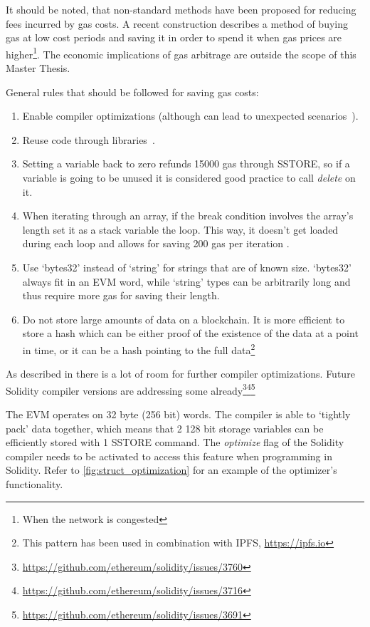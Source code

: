 It should be noted, that non-standard methods have been proposed for reducing fees incurred by gas costs. A recent construction \cite{gastoken} describes a method of buying gas at low cost periods and saving it in order to spend it when gas prices are higher\footnote{When the network is congested}. The economic implications of gas arbitrage are outside the scope of this Master Thesis. 

General rules that should be followed for saving gas costs:
\begin{enumerate}
    \item Enable compiler optimizations (although can lead to unexpected scenarios~\cite{compiler}).
    \item Reuse code through libraries~\cite{library}.
    \item Setting a variable back to zero refunds 15000 gas through SSTORE, so if a variable is going to be unused it is considered good practice to call \textit{delete} on it. 
    \item When iterating through an array, if the break condition involves the array's length set it as a stack variable the loop. This way, it doesn't get loaded during each loop and allows for saving 200 gas per iteration \cite{DBLP:journals/corr/ChenLLZ17}.
    \item Use `bytes32' instead of `string' for strings that are of known size. `bytes32' always fit in an EVM word, while `string' types can be arbitrarily long and thus require more gas for saving their length.
    \item Do not store large amounts of data on a blockchain. It is more efficient to store a hash which can be either proof of the existence of the data at a point in time, or it can be a hash pointing to the full data\footnote{This pattern has been used in combination with IPFS, \url{https://ipfs.io}}
\end{enumerate}

As described in \cite{DBLP:journals/corr/ChenLLZ17} there is a lot of room for further compiler optimizations. Future Solidity compiler versions are addressing some already\footnote{\url{https://github.com/ethereum/solidity/issues/3760}}\footnote{\url{https://github.com/ethereum/solidity/issues/3716}}\footnote{\url{https://github.com/ethereum/solidity/issues/3691}}

The EVM operates on 32 byte (256 bit) words. The compiler is able to `tightly pack' data together, which means that 2 128 bit storage variables can be efficiently stored with 1 SSTORE command. The \textit{optimize} flag of the Solidity compiler needs to be activated to access this feature when programming in Solidity. Refer to \ref{fig:struct_optimization} for an example of the optimizer's functionality.

